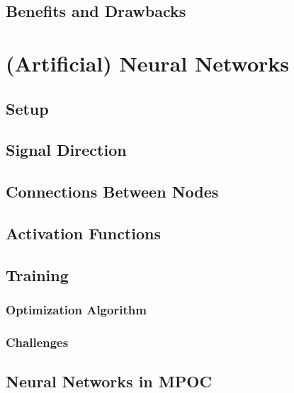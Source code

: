		\subsection{Benefits and Drawbacks} %

	\section{(Artificial) Neural Networks} %

		\subsection{Setup} %

		\subsection{Signal Direction} %

		\subsection{Connections Between Nodes} %

		\subsection{Activation Functions} %

		\subsection{Training} %

			\subsubsection{Optimization Algorithm} %

			\subsubsection{Challenges} %

		\subsection{Neural Networks in MPOC} %

